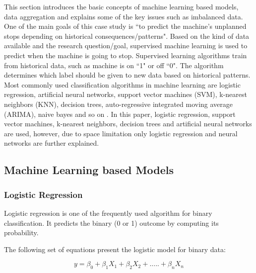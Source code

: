 \documentclass[runningheads]{llncs}
\begin{document}
This section introduces the basic concepts of machine learning based models, data aggregation and explains some of the key issues such as imbalanced data. One of the main goals of this case study is ``to predict the machine's unplanned stops depending on historical consequences/patterns". Based on the kind of data available and the research question/goal, supervised machine learning is used to predict when the machine is going to stop. Supervised learning algorithms train from historical data, such as machine is on ``1" or off ``0".  The algorithm determines which label should be given to new data based on historical patterns. Most commonly used classification algorithms in machine learning are logistic regression, artificial neural networks, support vector machines (SVM), k-nearest neighbors (KNN), decision trees, auto-regressive integrated moving average (ARIMA), naive bayes and so on \cite{gooijer}. In this paper, logistic regression, support vector machines, k-nearest neighbors, decision trees and artificial neural networks are used, however, due to space limitation only logistic regression and neural networks are further explained.


\subsection {Machine Learning based Models}

\subsubsection {Logistic Regression}
\label{sec:LR}
Logistic regression is one of the frequently used algorithm for binary classification. It predicts the binary (0 or 1) outcome by computing its probability.

The following set of equations present the logistic model for binary data:

\begin{equation}
\label{eq:eq10}
y = \beta_0 + \beta_1 X_1 + \beta_2 X_2 + ..... + \beta_n X_n
\end{equation}
\end{document}

